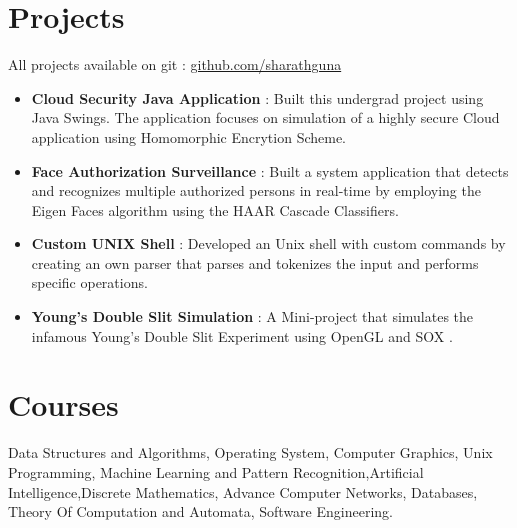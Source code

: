 \documentclass[margin, centered]{res}
\begin{document}
\begin{resume}
\section{Projects}
All projects available on git : \href{https://github.com/sharathguna}{ github.com/sharathguna }
\\
\begin{itemize}[leftmargin=*]


\item \textbf{{Cloud Security Java Application }}: Built this undergrad project using Java Swings. The application focuses on simulation of a highly secure Cloud application using Homomorphic Encrytion Scheme. 

 \item \textbf{{Face Authorization Surveillance }} : Built a system application that detects and recognizes
multiple authorized persons in real-time by employing the Eigen Faces algorithm using the HAAR Cascade Classifiers.

\item \textbf{{Custom UNIX Shell}} : Developed an Unix shell with custom commands by creating an own parser that parses and tokenizes the input and performs specific operations.

\item \textbf{{Young's Double Slit Simulation }}: A Mini-project that simulates the infamous Young's Double Slit Experiment using OpenGL and SOX .

\end{itemize}


\section{Courses}
Data Structures and Algorithms, Operating System, Computer Graphics, Unix Programming, Machine Learning and Pattern Recognition,Artificial Intelligence,Discrete Mathematics, Advance Computer Networks, Databases, Theory Of Computation and Automata, Software Engineering.


\end{resume}
\end{document}
